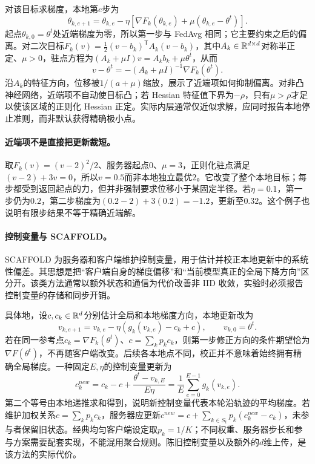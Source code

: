 对该目标求梯度，本地第$e$步为
\begin{equation}
 \theta_{k,e+1}=\theta_{k,e}-\eta
 [\nabla F_k(\theta_{k,e})+\mu(\theta_{k,e}-\theta^t)].
\end{equation}
起点$\theta_{k,0}=\theta^t$处近端梯度为零，所以第一步与 FedAvg 相同；它主要约束之后的偏离。对二次目标$F_k(v)=\tfrac12(v-b_k)^{\mathsf T}A_k(v-b_k)$，其中$A_k\in\mathbb{R}^{d\times d}$对称半正定、$\mu>0$，驻点方程为$(A_k+\mu I)v=A_kb_k+\mu\theta^t$，从而
\begin{equation}
 v-\theta^t=-(A_k+\mu I)^{-1}\nabla F_k(\theta^t).
\end{equation}
沿$A_k$的特征方向，位移被$1/(a+\mu)$缩放，展示了近端项如何抑制偏离。对非凸神经网络，近端项不自动使目标凸；若 Hessian 特征值下界为$-\rho$，只有$\mu>\rho$才足以使该区域的正则化 Hessian 正定。实际内层通常仅近似求解，应同时报告本地停止准则，而非默认获得精确极小点。

\paragraph{近端项不是直接把更新裁短。}
取$F_k(v)=(v-2)^2/2$、服务器起点$0$、$\mu=3$，正则化驻点满足$(v-2)+3v=0$，所以$v=0.5$而非本地独立最优$2$。它改变了整个本地目标；每步都受到返回起点的力，但并非强制要求位移小于某固定半径。若$\eta=0.1$，第一步仍为$0.2$，第二步梯度为$(0.2-2)+3(0.2)=-1.2$，更新至$0.32$。这个例子也说明有限步结果不等于精确近端解。

\paragraph{控制变量与 SCAFFOLD。}
SCAFFOLD 为服务器和客户端维护控制变量，用于估计并校正本地更新中的系统性偏差。其思想是把“客户端自身的梯度偏移”和“当前模型真正的全局下降方向”区分开。该类方法通常以额外状态和通信为代价改善非 IID 收敛，实验时必须报告控制变量的存储和同步开销。

具体地，设$c,c_k\in\mathbb{R}^d$分别估计全局和本地梯度方向，本地更新改为
\begin{equation}
 v_{k,e+1}=v_{k,e}-\eta(g_k(v_{k,e})-c_k+c),
 \qquad v_{k,0}=\theta^t.
\end{equation}
若在同一参考点$c_k=\nabla F_k(\theta^t)$、$c=\sum_kp_kc_k$，则第一步修正方向的条件期望恰为$\nabla F(\theta^t)$，不再随客户端改变。后续各本地点不同，校正并不意味着始终拥有精确全局梯度。一种固定$E,\eta$的控制变量更新为
\begin{equation}
 c_k^{new}=c_k-c+\frac{\theta^t-v_{k,E}}{E\eta}
 =\frac1E\sum_{e=0}^{E-1}g_k(v_{k,e}).
\end{equation}
第二个等号由本地递推求和得到，说明新控制变量代表本轮沿轨迹的平均梯度。若维护加权关系$c=\sum_kp_kc_k$，服务器应更新$c^{new}=c+\sum_{k\in S_t}p_k(c_k^{new}-c_k)$，未参与者保留旧状态。经典均匀客户端设定取$p_k=1/K$；不同权重、服务器步长和参与方案需要配套实现，不能混用聚合规则。陈旧控制变量以及额外的$d$维上传，是该方法的实际代价。

